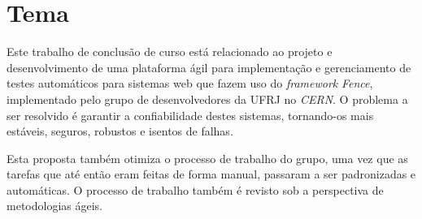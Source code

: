 \section{Tema}

Este trabalho de conclusão de curso está relacionado ao projeto e desenvolvimento de uma plataforma ágil para implementação e gerenciamento de testes automáticos para sistemas web que fazem uso do \emph{framework} \emph{Fence}, implementado pelo grupo de desenvolvedores da UFRJ no \emph{CERN}. O problema a ser resolvido é garantir a confiabilidade destes sistemas, tornando-os mais estáveis, seguros, robustos e isentos de falhas.

Esta proposta também otimiza o processo de trabalho do grupo, uma vez que as tarefas que até então eram feitas de forma manual, passaram a ser padronizadas e automáticas. O processo de trabalho também é revisto sob a perspectiva de metodologias ágeis.